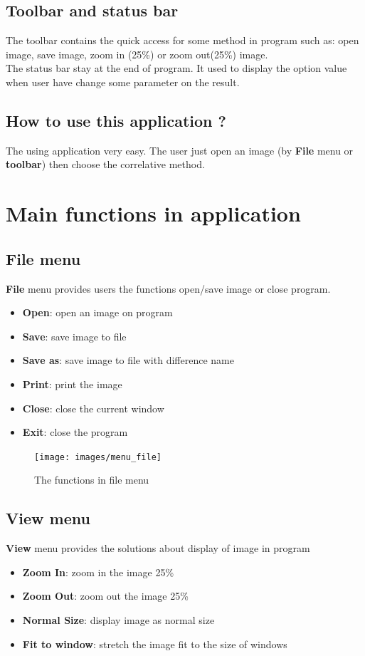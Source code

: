 \subsection{Toolbar and status bar}
The toolbar contains the quick access for some method in program such as: open image, save image, zoom in (25\%) or zoom out(25\%) image.\\[0.3cm]
The status bar stay at the end of program. It used to display the option value when user have change some parameter on the result.
\subsection{How to use this application ?}
The using application very easy. The user just open an image (by \textbf{File} menu or \textbf{toolbar}) then choose the correlative method.
\section{Main functions in application}
\subsection{File menu}
\textbf{File} menu provides users the functions open/save image or close program.
\begin{itemize}
	\item \textbf{Open}: open an image on program
	\item \textbf{Save}: save image to file
	\item \textbf{Save as}: save image to file with difference name
	\item \textbf{Print}: print the image
	\item \textbf{Close}: close the current window
	\item \textbf{Exit}: close the program
\end{itemize}
\begin{figure}[h!]
\centering
\texttt{[image: images/menu\_file]}
\caption{The functions in file menu}
\label{fig:figure_31}
\end{figure}
\subsection{View menu}
\textbf{View} menu provides the solutions about display of image in program
\begin{itemize}
	\item \textbf{Zoom In}: zoom in the image 25\%
	\item \textbf{Zoom Out}: zoom out the image 25\%
	\item \textbf{Normal Size}: display image as normal size
	\item \textbf{Fit to window}: stretch the image fit to the size of windows
\end{itemize}
